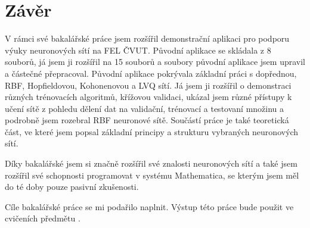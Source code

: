 \documentclass[11pt,twoside,a4paper]{book}
\begin{document}
\chapter{Závěr}
V rámci své bakalářské práce jsem rozšířil demonstrační aplikaci pro podporu výuky neuronových sítí na FEL ČVUT. Původní aplikace se skládala z 8 souborů, já jsem ji rozšířil na 15 souborů a soubory původní aplikace jsem upravil a částečné přepracoval. Původní aplikace pokrývala základní práci s dopřednou, RBF, Hopfieldovou, Kohonenovou a LVQ sítí. Já jsem ji rozšířil o demonstraci různých trénovacích algoritmů, křížovou validaci, ukázal jsem různé přístupy k učení sítě z pohledu dělení dat na validační, trénovací a testovaní množinu a podrobně jsem rozebral  RBF neuronové sítě. Součástí práce je také teoretická část, ve které jsem popsal základní principy a strukturu vybraných neuronových sítí.

Díky bakalářské jsem si značně rozšířil své znalosti neuronových sítí a také jsem rozšířil své schopnosti programovat v systému Mathematica, se kterým jsem měl do té doby pouze pasivní zkušenosti.

Cíle bakalářské práce se mi podařilo naplnit. Výstup této práce bude použit ve cvičeních předmětu .

%




%
{
\def\CS{$\cal C\kern-0.1667em\lower.5ex\hbox{$\cal S$}\kern-0.075em $}

}

%
\end{document}
